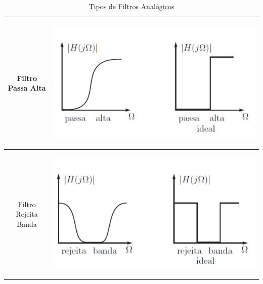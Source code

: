 \documentclass{article}
\begin{document}
\begin{table}[h!]
\begin{tabularx}{\textwidth}{|c|X|}
              Filtro Passa Alta &  \begin{center}
                    
                \begin{minipage}{0.3\textwidth}
              \centering
              \includegraphics[width=\textwidth]{imgs/passa_alta.jpeg}
          \end{minipage} \end{center}\\ \hline

                          Filtro Rejeita Banda &  \begin{center}
                    
                \begin{minipage}{0.3\textwidth}
              \centering
              \includegraphics[width=\textwidth]{imgs/rejeita_banda.jpeg}
          \end{minipage} \end{center}\\ \hline
    \end{tabularx}
    \caption{Tipos de Filtros Analógicos}
    \label{tab:my_label}
\end{table}
\end{document}
